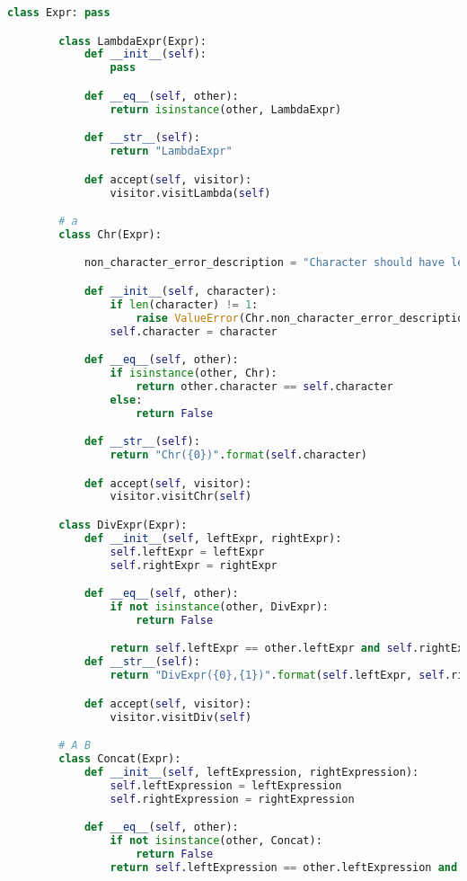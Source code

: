     \begin{lstlisting}[language=Python]
        class Expr: pass

        class LambdaExpr(Expr):
            def __init__(self):
                pass

            def __eq__(self, other):
                return isinstance(other, LambdaExpr)

            def __str__(self):
                return "LambdaExpr"

            def accept(self, visitor):
                visitor.visitLambda(self)

        # a
        class Chr(Expr):

            non_character_error_description = "Character should have length one"

            def __init__(self, character):
                if len(character) != 1:
                    raise ValueError(Chr.non_character_error_description)
                self.character = character

            def __eq__(self, other):
                if isinstance(other, Chr):
                    return other.character == self.character
                else:
                    return False

            def __str__(self):
                return "Chr({0})".format(self.character)

            def accept(self, visitor):
                visitor.visitChr(self)

        class DivExpr(Expr):
            def __init__(self, leftExpr, rightExpr):
                self.leftExpr = leftExpr
                self.rightExpr = rightExpr

            def __eq__(self, other):
                if not isinstance(other, DivExpr):
                    return False

                return self.leftExpr == other.leftExpr and self.rightExpr == other.rightExpr
            def __str__(self):
                return "DivExpr({0},{1})".format(self.leftExpr, self.rightExpr)

            def accept(self, visitor):
                visitor.visitDiv(self)

        # A B
        class Concat(Expr):
            def __init__(self, leftExpression, rightExpression):
                self.leftExpression = leftExpression
                self.rightExpression = rightExpression

            def __eq__(self, other):
                if not isinstance(other, Concat):
                    return False
                return self.leftExpression == other.leftExpression and self.rightExpression == other.rightExpression


\end{lstlisting}

